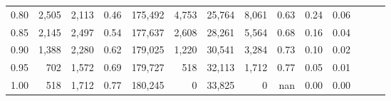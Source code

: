 \begin{tabular}{rrrrrrrrrrrrrr}
0.80 &   2,505 &  2,113 &  0.46 &  175,492 &    4,753 &  25,764 &   8,061 &  0.63 &  0.24 &      0.06 \\
0.85 &   2,145 &  2,497 &  0.54 &  177,637 &    2,608 &  28,261 &   5,564 &  0.68 &  0.16 &      0.04 \\
0.90 &   1,388 &  2,280 &  0.62 &  179,025 &    1,220 &  30,541 &   3,284 &  0.73 &  0.10 &      0.02 \\
0.95 &     702 &  1,572 &  0.69 &  179,727 &      518 &  32,113 &   1,712 &  0.77 &  0.05 &      0.01 \\
1.00 &     518 &  1,712 &  0.77 &  180,245 &        0 &  33,825 &       0 &   nan &  0.00 &      0.00 \\
\bottomrule
\end{tabular}
